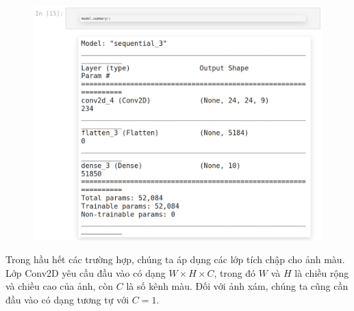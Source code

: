 \documentclass{book}
\begin{document}
\begin{figure}[H]
    \centering
    \includegraphics[width=1.0\linewidth]{images/code3.png}
    \label{fig:code3}
\end{figure}
Trong hầu hết các trường hợp, chúng ta áp dụng các lớp tích chập cho ảnh màu. Lớp Conv2D yêu cầu đầu vào có dạng \( W \times H \times C \), trong đó \( W \) và \( H \) là chiều rộng và chiều cao của ảnh, còn \( C \) là số kênh màu. Đối với ảnh xám, chúng ta cũng cần đầu vào có dạng tương tự với \( C = 1 \).
\end{document}

